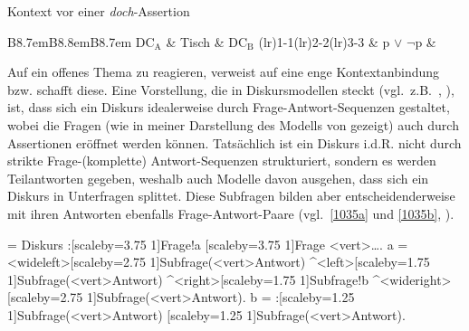 \begin{exe}
	\ex\label{1035} Kontext vor einer \textit{doch}-Assertion\\[-1em]
 	\begin{tabular}[t]{B{8.7em}B{8.8em}B{8.7em}}
\lsptoprule 	
 	$\textrm{DC}_{\textrm{A}}$ & {Tisch} & $\textrm{DC}_{\textrm{B}}$ \tabularnewline\cmidrule(lr){1-1}\cmidrule(lr){2-2}\cmidrule(lr){3-3}
    & p $\vee$ $\neg$p & \tabularnewline\midrule      
   	 \tabularnewline   
   	\lspbottomrule
\end{tabular}
\end{exe}
Auf ein offenes Thema zu reagieren, verweist auf eine enge Kontextanbindung bzw. schafft diese. Eine Vorstellung, die in Diskursmodellen steckt (vgl.\ z.B.\ \citealt{Roberts1996}, \citealt{Buering2003}), ist, dass sich ein Diskurs idealerweise durch Frage-Antwort-Sequenzen gestaltet, wobei die Fragen (wie in meiner Darstellung des Modells von \citealt{Farkas2010} gezeigt) auch durch Assertionen eröffnet werden können. Tatsächlich ist ein Diskurs i.d.R. nicht durch strikte Frage-(kom\-plet\-te) Antwort-Sequenzen strukturiert, sondern es werden Teilantworten gegeben, wes\-halb auch Modelle davon ausgehen, dass sich ein Diskurs in Unterfragen splittet. Diese Subfragen bilden aber entscheidenderweise mit ihren Antworten ebenfalls Frage-Antwort-Paare (vgl.\ \ref{1035a} und \ref{1035b}, \citealt[515--516]{Buering2003}).

\begin{exe}
\ex \label{1035a}
        \begin{jtree}
        \! = {Diskurs}
                :[scaleby=3.75 1]{Frage}!a [scaleby=3.75 1]{Frage}
                <vert>{\ldots}.
        \!a = <wideleft>[scaleby=2.75 1]{Subfrage}(<vert>{Antwort}) ^<left>[scaleby=1.75 1]{Subfrage}(<vert>{Antwort}) ^<right>[scaleby=1.75 1]{Subfrage}!b ^<wideright>[scaleby=2.75 1]{Subfrage}(<vert>{Antwort}).
        \!b = :[scaleby=1.25 1]{Subfrage}(<vert>{Antwort}) [scaleby=1.25 1]{Subfrage}(<vert>{Antwort}).
        \end{jtree}
\end{exe}

